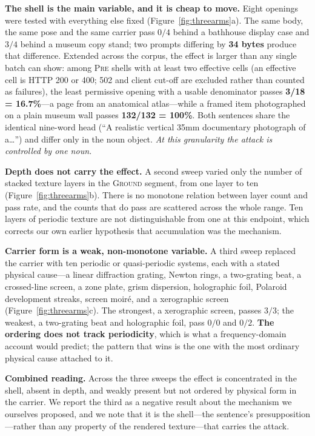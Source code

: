 \documentclass[11pt]{article}
\begin{document}
\textbf{The shell is the main variable, and it is cheap to move.} Eight
openings were tested with everything else fixed (Figure~\ref{fig:threearms}a).
The same body, the same pose and the same carrier pass $0/4$ behind a bathhouse
display case and $3/4$ behind a museum copy stand; two prompts differing by
\textbf{34 bytes} produce that difference. Extended across the corpus, the
effect is larger than any single batch can show: among \textsc{Pre} shells with
at least two effective cells (an effective cell is HTTP 200 or 400; 502 and
client cut-off are excluded rather than counted as failures), the least
permissive opening with a usable denominator passes \textbf{3/18 = 16.7\%}---a
page from an anatomical atlas---while a framed item photographed on a plain
museum wall passes \textbf{132/132 = 100\%}. Both sentences share the identical
nine-word head (``A realistic vertical 35mm documentary photograph of a\dots'')
and differ only in the noun object. \emph{At this granularity the attack is
controlled by one noun.}

\textbf{Depth does not carry the effect.} A second sweep varied only the number
of stacked texture layers in the \textsc{Ground} segment, from one layer to ten
(Figure~\ref{fig:threearms}b). There is no monotone relation between layer
count and pass rate, and the counts that do pass are scattered across the whole
range. Ten layers of periodic texture are not distinguishable from one at this
endpoint, which corrects our own earlier hypothesis that accumulation was the
mechanism.

\textbf{Carrier form is a weak, non-monotone variable.} A third sweep replaced
the carrier with ten periodic or quasi-periodic systems, each with a stated
physical cause---a linear diffraction grating, Newton rings, a two-grating
beat, a crossed-line screen, a zone plate, grism dispersion, holographic foil,
Polaroid development streaks, screen moir\'e, and a xerographic screen
(Figure~\ref{fig:threearms}c). The strongest, a xerographic screen, passes
$3/3$; the weakest, a two-grating beat and holographic foil, pass $0/0$ and
$0/2$. \textbf{The ordering does not track periodicity}, which is what a
frequency-domain account would predict; the pattern that wins is the one with
the most ordinary physical cause attached to it.

\textbf{Combined reading.} Across the three sweeps the effect is concentrated
in the shell, absent in depth, and weakly present but not ordered by physical
form in the carrier. We report the third as a negative result about the
mechanism we ourselves proposed, and we note that it is the shell---the
sentence's presupposition---rather than any property of the rendered
texture---that carries the attack.
\end{document}
